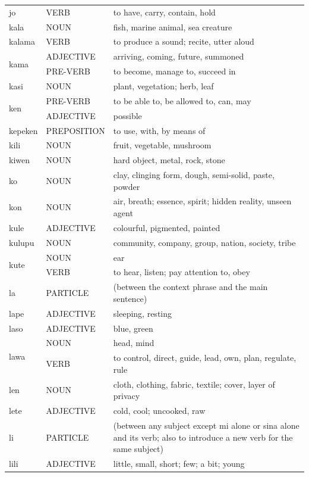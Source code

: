 \documentclass[14pt, a4paper]{extreport}
\begin{document}
\begin{longtable}{llp{10cm}}
  jo & VERB & to have, carry, contain, hold \\
  kala & NOUN & fish, marine animal, sea creature \\
  kalama & VERB & to produce a sound; recite, utter aloud \\
  \multirow[t]{2}{*}{kama} & ADJECTIVE & arriving, coming, future, summoned \\
  & PRE-VERB & to become, manage to, succeed in \\
  kasi & NOUN & plant, vegetation; herb, leaf \\
  \multirow[t]{2}{*}{ken} & PRE-VERB & to be able to, be allowed to, can, may \\
  & ADJECTIVE & possible \\
  kepeken & PREPOSITION & to use, with, by means of \\
  kili & NOUN & fruit, vegetable, mushroom \\
  kiwen & NOUN & hard object, metal, rock, stone \\
  ko & NOUN & clay, clinging form, dough, semi-solid, paste, powder \\
  kon & NOUN & air, breath; essence, spirit; hidden reality, unseen agent \\
  kule & ADJECTIVE & colourful, pigmented, painted \\
  kulupu & NOUN & community, company, group, nation, society, tribe \\
  \multirow[t]{2}{*}{kute} & NOUN & ear \\
  & VERB & to hear, listen; pay attention to, obey \\
  la & PARTICLE & (between the context phrase and the main sentence) \\
  lape & ADJECTIVE & sleeping, resting \\
  laso & ADJECTIVE & blue, green \\
  \multirow[t]{2}{*}{lawa} & NOUN & head, mind \\
  & VERB & to control, direct, guide, lead, own, plan, regulate, rule \\
  len & NOUN & cloth, clothing, fabric, textile; cover, layer of privacy \\
  lete & ADJECTIVE & cold, cool; uncooked, raw \\
  li & PARTICLE & (between any subject except mi alone or sina alone and its verb; also to introduce a new verb for the same subject) \\
  lili & ADJECTIVE & little, small, short; few; a bit; young \\

\end{longtable}
\end{document}
